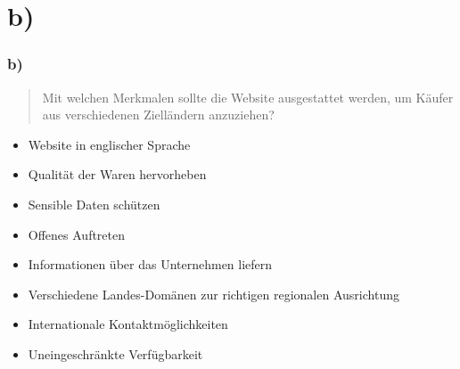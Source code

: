\documentclass{beamer}
\begin{document}
\section{b)}
\begin{frame}
\frametitle{b)}

\begin{quote}
Mit welchen Merkmalen sollte die Website ausgestattet werden, um Käufer aus verschiedenen Zielländern anzuziehen?
\end{quote}

\begin{itemize}
\setlength{\itemsep}{6pt}
\item Website in englischer Sprache
\item Qualit\"at der Waren hervorheben
\item Sensible Daten sch\"utzen
\item Offenes Auftreten
\item Informationen \"uber das Unternehmen liefern
\item Verschiedene Landes-Dom\"anen  zur richtigen regionalen Ausrichtung
\item Internationale Kontaktm\"oglichkeiten
\item Uneingeschr\"ankte Verf\"ugbarkeit
\end{itemize}

\end{frame}
\end{document}
